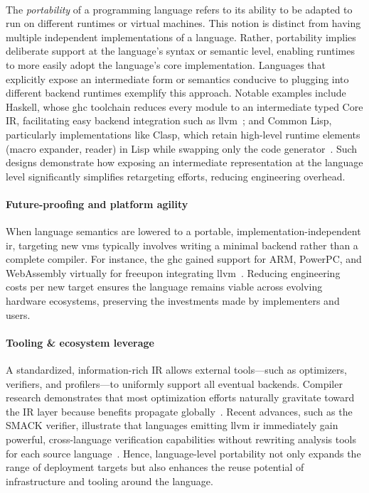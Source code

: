 	\paragraph{}%
  		The \emph{portability} of a programming language refers to its ability to be adapted to run on different runtimes or virtual machines. This notion is distinct from having multiple independent implementations of a language. Rather, portability implies deliberate support at the language's syntax or semantic level, enabling runtimes to more easily adopt the language's core implementation. Languages that explicitly expose an intermediate form or semantics conducive to plugging into different backend runtimes exemplify this approach. Notable examples include Haskell, whose \gls{ghc} toolchain reduces every module to an intermediate typed Core IR, facilitating easy backend integration such as \gls{llvm}~\cite{ghc_llvm_backend}; and Common Lisp, particularly implementations like Clasp, which retain high-level runtime elements (macro expander, reader) in Lisp while swapping only the code generator~\cite{clasp_llvm}. Such designs demonstrate how exposing an intermediate representation at the language level significantly simplifies retargeting efforts, reducing engineering overhead.


	\paragraph{Future-proofing and platform agility}%
		When language semantics are lowered to a portable, implementation-independent \gls{ir}, targeting new \glspl{vm} typically involves writing a minimal backend rather than a complete compiler. For instance, the \gls{ghc} gained support for ARM, PowerPC, and WebAssembly virtually \smartQL for free\smartQR upon integrating \gls{llvm}~\cite{ghc_llvm_backend}. Reducing engineering costs per new target ensures the language remains viable across evolving hardware ecosystems, preserving the investments made by implementers and users.

	\paragraph{Tooling \& ecosystem leverage}%
		A standardized, information-rich IR allows external tools—such as optimizers, verifiers, and profilers—to uniformly support all eventual backends. Compiler research demonstrates that most optimization efforts naturally gravitate toward the IR layer because benefits propagate globally~\cite{ir_cacm}. Recent advances, such as the SMACK verifier, illustrate that languages emitting \gls{llvm} \gls{ir} immediately gain powerful, cross-language verification capabilities without rewriting analysis tools for each source language~\cite{llvm_verification}. Hence, language-level portability not only expands the range of deployment targets but also enhances the reuse potential of infrastructure and tooling around the language.

